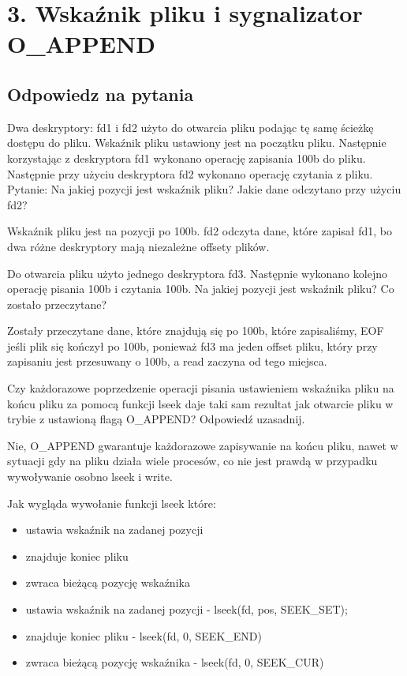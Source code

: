 \documentclass[a4paper,15pt]{article}
\newcommand{\ask}[2]{
    \begin{tcolorbox}[colback=black!5!white,colframe=gray,title={Pytanie #1}]
        #2
    \end{tcolorbox}
}
\begin{document}
\newpage
\section{3. Wskaźnik pliku i sygnalizator O\_APPEND}

\subsection{Odpowiedz na pytania}

\ask{}{
Dwa deskryptory: fd1 i fd2 użyto do otwarcia pliku podając tę samę ścieżkę dostępu do pliku. Wskaźnik pliku ustawiony jest na początku pliku. Następnie korzystając z deskryptora fd1 wykonano operację zapisania 100b do pliku. Następnie przy użyciu deskryptora fd2 wykonano operację czytania z pliku. Pytanie: Na jakiej pozycji jest wskaźnik pliku? Jakie dane odczytano przy użyciu fd2?
} 
Wskaźnik pliku jest na pozycji po 100b. fd2 odczyta dane, które zapisał fd1, bo dwa różne deskryptory mają niezależne offsety plików.

\ask{}{
Do otwarcia pliku użyto jednego deskryptora fd3. Następnie wykonano kolejno operację pisania 100b i czytania 100b. Na jakiej pozycji jest wskaźnik pliku? Co zostało przeczytane? 
} 
Zostały przeczytane dane, które znajdują się po 100b, które zapisaliśmy, EOF jeśli plik się kończył po 100b, ponieważ fd3 ma jeden offset pliku, który przy zapisaniu jest przesuwany o 100b, a read zaczyna od tego miejsca.


\ask{}{
Czy każdorazowe poprzedzenie operacji pisania ustawieniem wskaźnika pliku na końcu pliku za pomocą funkcji lseek daje taki sam rezultat jak otwarcie pliku w trybie z ustawioną flagą O\_APPEND? Odpowiedź uzasadnij. 
} 
Nie, O\_APPEND gwarantuje każdorazowe zapisywanie na końcu pliku, nawet w sytuacji gdy na pliku działa wiele procesów, co nie jest prawdą w przypadku wywoływanie osobno lseek i write.

\ask{}{
Jak wygląda wywołanie funkcji lseek które:
\begin{itemize}
\item ustawia wskaźnik na zadanej pozycji
\item znajduje koniec pliku
\item zwraca bieżącą pozycję wskaźnika
\end{itemize}
} 
\begin{itemize}
\item ustawia wskaźnik na zadanej pozycji - lseek(fd, pos, SEEK\_SET); 
\item znajduje koniec pliku - lseek(fd, 0, SEEK\_END)
\item zwraca bieżącą pozycję wskaźnika - lseek(fd, 0, SEEK\_CUR)
\end{itemize}
\end{document}

